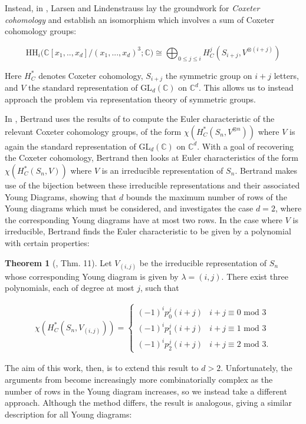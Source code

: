 \documentclass[12pt]{amsart}
\theoremstyle{definition}
\newtheorem{thm}{Theorem}
\begin{document}
Instead, in \cite{LL}, Larsen and Lindenstrauss lay the groundwork for \textit{Coxeter cohomology} and establish an isomorphism which involves a sum of Coxeter cohomology groups:

\[ \text{HH}_i(\mathbb{C}[x_1, .., x_d]/(x_1, ..., x_d)^3; \mathbb{C)} \cong \bigoplus_{0\leq j \leq i} H^j_C (S_{i+j}, V^{\otimes (i+j)})\]

Here $H_C^*$ denotes Coxeter cohomology, $S_{i+j}$ the symmetric group on $i+j$ letters, and $V$ the standard representation of GL$_d(\mathbb{C})$ on $\mathbb{C}^d$. This allows us to instead approach the problem via representation theory of symmetric groups.

In \cite{B}, Bertrand uses the results of \cite{LL} to compute the Euler characteristic of the relevant Coxeter cohomology groups, of the form $\chi(H_C^*(S_n, V^{\otimes n}))$ where $V$ is again the standard representation of GL$_d(\mathbb{C})$ on $\mathbb{C}^d$. With a goal of recovering the Coxeter cohomology, Bertrand then looks at Euler characteristics of the form $\chi(H_C^*(S_n, V))$ where $V$ is an irreducible representation of $S_n$. Bertrand makes use of the bijection between these irreducible representations and their associated Young Diagrams, showing that $d$ bounds the maximum number of rows of the Young diagrams which must be considered, and investigates the case $d=2$, where the corresponding Young diagrams have at most two rows. In the case where $V$ is irreducible, Bertrand finds the Euler characteristic to be given by a polynomial with certain properties:

\begin{thm}[\cite{B}, Thm. 11] \label{thm1}
Let $V_{(i,j)}$ be the irreducible representation of $S_n$ whose corresponding Young diagram is given by $\lambda = (i, j)$. There exist three polynomials, each of degree at most $j$, such that

\begin{align*}
 \chi(H_C^*(S_n, V_{(i, j)})) = 
\begin{cases}
(-1)^{i}p^j_0(i+j) & i+j \equiv 0 \text{ mod }3 \\
(-1)^{i}p^j_1(i+j) & i+j \equiv 1 \text{ mod }3 \\
(-1)^{i}p^j_2(i+j) & i+j \equiv 2 \text{ mod }3 .
 \end{cases} 
 \end{align*}

\end{thm}

The aim of this work, then, is to extend this result to $d > 2$. Unfortunately, the arguments from \cite{B} become increasingly more combinatorially complex as the number of rows in the Young diagram increases, so we instead take a different approach. Although the method differs, the result is analogous, giving a similar description for all Young diagrams:
\end{document}
